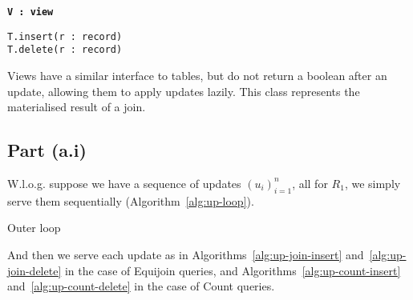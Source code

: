 \begin{marginfigure}
  \textbf{\texttt{V\,:\,view}}
  \begin{description}
    \item[\texttt{T.insert(r\,:\,record)}]
    \item[\texttt{T.delete(r\,:\,record)}]
  \end{description}
  \caption{Views have a similar interface to tables, but do not return a boolean after an update, allowing them to apply updates lazily. This class represents the materialised result of a join.}\label{iface:view}
\end{marginfigure}

\subsection{Part (a.i)}\label{sec:q-1-a-i}

W.l.o.g. suppose we have a sequence of updates $(u_i)_{i=1}^n$, all for $R_1$, we simply serve them sequentially (Algorithm~\ref{alg:up-loop}).

\begin{algorithm}
  \caption{Outer loop}\label{alg:up-loop}
\end{algorithm}

And then we serve each update as in Algorithms~\ref{alg:up-join-insert} and~\ref{alg:up-join-delete} in the case of Equijoin queries, and Algorithms~\ref{alg:up-count-insert} and~\ref{alg:up-count-delete} in the case of Count queries.

